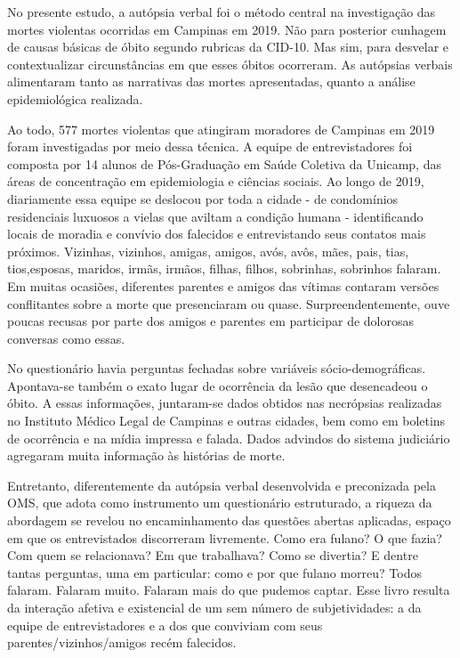 No presente estudo, a autópsia verbal foi o método central na investigação das mortes violentas ocorridas em Campinas em 2019. Não para posterior cunhagem de causas básicas de óbito segundo rubricas da CID-10. Mas sim, para desvelar e contextualizar circunstâncias em que esses óbitos ocorreram. As autópsias verbais alimentaram tanto as narrativas das mortes apresentadas, quanto a análise epidemiológica realizada.

Ao todo, 577 mortes violentas que atingiram moradores de Campinas em 2019 foram investigadas por meio dessa técnica. A equipe de entrevistadores foi composta por 14 alunos de Pós-Graduação em Saúde Coletiva da Unicamp, das áreas de concentração em epidemiologia e ciências sociais. Ao longo de 2019, diariamente essa equipe se deslocou por toda a cidade - de condomínios residenciais luxuosos a vielas que aviltam a condição humana - identificando locais de moradia e convívio dos falecidos e entrevistando seus contatos mais próximos. Vizinhas, vizinhos, amigas, amigos, avós, avôs, mães, pais, tias, tios,esposas, maridos, irmãs, irmãos, filhas, filhos, sobrinhas, sobrinhos falaram. Em muitas ocasiões, diferentes parentes e amigos das vítimas contaram versões conflitantes sobre a morte que presenciaram ou quase. Surpreendentemente, ouve poucas recusas por parte dos amigos e parentes em participar de dolorosas conversas como essas.

No questionário havia perguntas fechadas sobre variáveis sócio-demográficas. Apontava-se também o exato lugar de ocorrência da lesão que desencadeou o óbito. A essas informações, juntaram-se dados obtidos nas necrópsias realizadas no Instituto Médico Legal de Campinas e outras cidades, bem como em boletins de ocorrência e na mídia impressa e falada. Dados advindos do sistema judiciário agregaram muita informação às histórias de morte.

Entretanto, diferentemente da autópsia verbal desenvolvida e preconizada pela OMS, que adota como instrumento um questionário estruturado, a riqueza da abordagem se revelou no encaminhamento das questões abertas aplicadas, espaço em que os entrevistados discorreram livremente. Como era fulano? O que fazia? Com quem se relacionava? Em que trabalhava? Como se divertia? E dentre tantas perguntas, uma em particular: como e por que fulano morreu? Todos falaram. Falaram muito. Falaram mais do que pudemos captar. Esse livro resulta da interação afetiva e existencial de um sem número de subjetividades: a da equipe de entrevistadores e a dos que conviviam com seus parentes/vizinhos/amigos recém falecidos.

